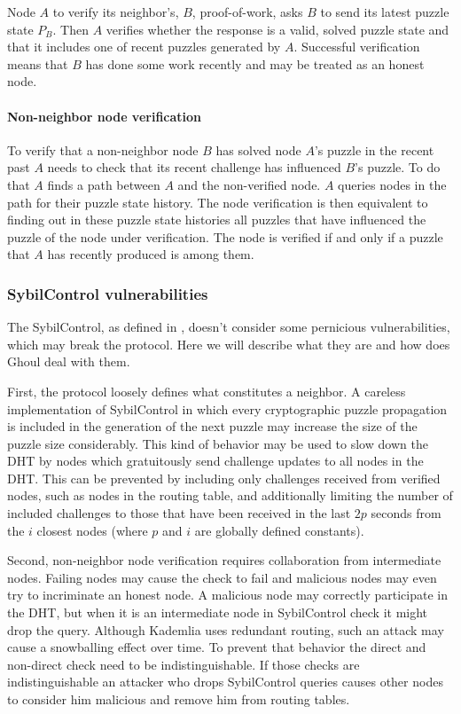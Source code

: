   Node $A$ to verify its neighbor's, $B$, proof-of-work, asks $B$
  to send its latest puzzle state $P_B$.
  Then $A$ verifies whether the response is a valid, solved puzzle state and
  that it includes one of recent puzzles generated by $A$.
  Successful verification means that $B$ has done some work recently and may be
  treated as an honest node.

  \paragraph{Non-neighbor node verification}
  To verify that a non-neighbor node $B$ has solved node $A$'s puzzle in the
  recent past $A$ needs to check that its recent challenge has influenced $B$'s
  puzzle. 
  To do that $A$ finds a path between $A$ and the non-verified node.
  $A$ queries nodes in the path for their puzzle state history.
  The node verification is then equivalent to finding out in these puzzle state
  histories all puzzles that have influenced the puzzle of the node under
  verification.
  The node is verified if and only if a puzzle that $A$ has recently produced is
  among them.

\subsubsection{SybilControl vulnerabilities}
  The SybilControl, as defined in \cite{li12}, doesn't consider some pernicious
  vulnerabilities, which may break the protocol.
  Here we will describe what they are and how does Ghoul deal with them.

  First, the protocol loosely defines what constitutes a neighbor. A careless
  implementation of SybilControl in which every cryptographic puzzle propagation
  is included in the generation of the next puzzle may increase the size of the
  puzzle size considerably.
  This kind of behavior may be used to slow down the DHT by nodes which
  gratuitously send challenge updates to all nodes in the DHT.
  This can be prevented by including only challenges received from verified
  nodes, such as nodes in the routing table, and additionally limiting the
  number of included challenges to those that have been received in the last
  $2p$ seconds from the $i$ closest nodes (where $p$ and $i$ are globally
  defined constants).

  Second, non-neighbor node verification requires collaboration from
  intermediate nodes.
  Failing nodes may cause the check to fail and malicious nodes may even try to
  incriminate an honest node. A malicious node may correctly participate in the
  DHT, but when it is an intermediate node in SybilControl check it might drop
  the query. Although Kademlia uses redundant routing, such an attack may cause
  a snowballing effect over time. To prevent that behavior the direct and
  non-direct check need to be indistinguishable.  If those checks are
  indistinguishable an attacker who drops SybilControl queries causes other
  nodes to consider him malicious and remove him from routing tables.

